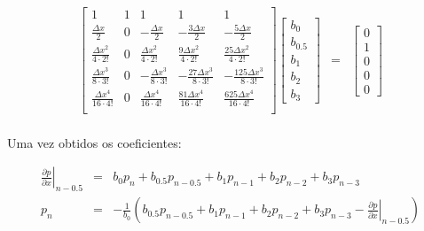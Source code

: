 \documentclass[introducao.tex]{subfiles}
\begin{document}
\begin{eqnarray}
\left[\begin{array}{ccccc}
1 & 1 & 1 & 1 & 1\\
\frac{\Delta x}{2} & 0 & -\frac{\Delta x}{2} & -\frac{3\Delta x}{2} & -\frac{5\Delta x}{2}\\
\frac{\Delta x^2}{4\cdot 2!} & 0 & \frac{\Delta x^2}{4\cdot 2!} & \frac{9\Delta x^2}{4\cdot 2!} & \frac{25\Delta x^2}{4\cdot 2!}\\
\frac{\Delta x^3}{8\cdot 3!} & 0 & -\frac{\Delta x^3}{8\cdot 3!} & -\frac{27\Delta x^3}{8\cdot 3!} & -\frac{125\Delta x^3}{8\cdot 3!}\\
\frac{\Delta x^4}{16\cdot 4!} & 0 & \frac{\Delta x^4}{16\cdot 4!} & \frac{81\Delta x^4}{16\cdot 4!} & \frac{625\Delta x^4}{16\cdot 4!}\\
\end{array}\right]\left[\begin{array}{c}b_0\\ b_{0.5}\\ b_1\\ b_2\\ b_3\end{array}\right] & = & \left[\begin{array}{c}0\\ 1\\ 0\\ 0\\ 0\end{array}\right]
\end{eqnarray}

\paragraph{} Uma vez obtidos os coeficientes:

\begin{eqnarray}
\left.\frac{\partial p}{\partial x}\right|_{n-0.5} & = & b_0 p_n + b_{0.5} p_{n-0.5} + b_1 p_{n-1} + b_2 p_{n-2} + b_3 p_{n-3}\\
p_n & = & -\frac{1}{b_0}\left(b_{0.5} p_{n-0.5} + b_1 p_{n-1} + b_2 p_{n-2} + b_3 p_{n-3} - \left.\frac{\partial p}{\partial x}\right|_{n-0.5}\right)
\end{eqnarray}
\end{document}
